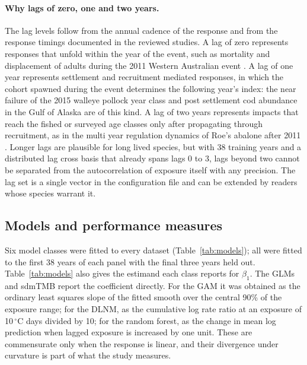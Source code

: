 \paragraph{Why lags of zero, one and two years.}
The lag levels follow from the annual cadence of the response and from the response timings documented in the reviewed studies. A lag of zero represents responses that unfold within the year of the event, such as mortality and displacement of adults during the 2011 Western Australian event \citep{caputi2016,yang2019}. A lag of one year represents settlement and recruitment mediated responses, in which the cohort spawned during the event determines the following year's index: the near failure of the 2015 walleye pollock year class \citep{rogers2021} and post settlement cod abundance in the Gulf of Alaska \citep{abookire2022,almeida2024} are of this kind. A lag of two years represents impacts that reach the fished or surveyed age classes only after propagating through recruitment, as in the multi year regulation dynamics of Roe's abalone after 2011 \citep{hart2018}. Longer lags are plausible for long lived species, but with 38 training years and a distributed lag cross basis that already spans lags 0 to 3, lags beyond two cannot be separated from the autocorrelation of exposure itself with any precision. The lag set is a single vector in the configuration file and can be extended by readers whose species warrant it.

\subsection{Models and performance measures}\label{sec:simmodels}

Six model classes were fitted to every dataset (Table~\ref{tab:models}); all were fitted to the first 38 years of each panel with the final three years held out. Table~\ref{tab:models} also gives the estimand each class reports for $\beta_1$. The GLMs and sdmTMB report the coefficient directly. For the GAM it was obtained as the ordinary least squares slope of the fitted smooth over the central 90\% of the exposure range; for the DLNM, as the cumulative log rate ratio at an exposure of 10\,$^{\circ}$C days divided by 10; for the random forest, as the change in mean log prediction when lagged exposure is increased by one unit. These are commensurate only when the response is linear, and their divergence under curvature is part of what the study measures.

